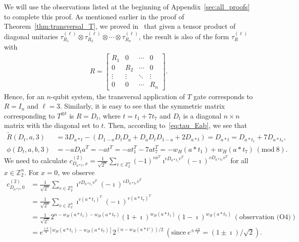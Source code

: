 \documentclass[twoside,romanappendices]{IEEEtran}
\begin{document}
We will use the observations listed at the beginning of Appendix~\ref{sec:all_proofs} to complete this proof.
As mentioned earlier in the proof of Theorem~\ref{thm:transversal_T}, we proved in~\cite{Rengaswamy-pra19} that given a tensor product of diagonal unitaries $\tau_{R_1}^{(\ell)} \otimes \tau_{R_2}^{(\ell)} \otimes \cdots \otimes \tau_{R_n}^{(\ell)}$, the result is also of the form $\tau_R^{(\ell)}$ with 
\begin{align}
R = 
\begin{bmatrix}
R_1 & 0 & \cdots & 0 \\
0 & R_2 & \cdots & 0 \\
\vdots & \vdots & \ddots & \vdots \\
0 & 0 & \cdots & R_n 
\end{bmatrix}.
\end{align}
Hence, for an $n$-qubit system, the transversal application of $T$ gate corresponds to $R = I_n$ and $\ell = 3$.
Similarly, it is easy to see that the symmetric matrix corresponding to $T^{\otimes t}$ is $R = D_t$, where $t = t_1 + 7 t_7$ and $D_t$ is a diagonal $n \times n$ matrix with the diagonal set to $t$.
Then, according to~\eqref{eq:tau_Eab}, we see that
\begin{align}
\tilde{R}(D_t,a,3) & = 3 D_{a \ast t} - (D_{1-a} D_t D_a + D_a D_t D_{1-a} + 2 D_{a \ast t}) = D_{a \ast t} = D_{a \ast t_1} + 7 D_{a \ast t_7}, \\
%
\phi(D_t,a,b,3) & = - a D_t a^T = - at^T = -at_1^T - 7 at_7^T = - w_H(a \ast t_1) + w_H(a \ast t_7)\ (\text{mod}\ 8).
\end{align}
We need to calculate $c_{D_{a \ast t},x}^{(2)} = \frac{1}{\sqrt{2^n}} \sum_{v \in \mathbb{Z}_2^n} (-1)^{vx^T} \imath^{v D_{a \ast t_1} v^T} (-\imath)^{v D_{a \ast t_7} v^T}$ for all $x \in \mathbb{Z}_2^n$.
For $x = 0$, we observe
\begin{align}
c_{D_{a \ast t},0}^{(2)} & = \frac{1}{\sqrt{2^n}} \sum_{v \in \mathbb{Z}_2^n} \imath^{v D_{a \ast t_1} v^T} (-\imath)^{v D_{a \ast t_7} v^T} \\
%
  & = \frac{1}{\sqrt{2^n}} \sum_{v \in \mathbb{Z}_2^n} \imath^{v (a \ast t_1)^T} (-\imath)^{v (a \ast t_7)^T} \\
%
  & = \frac{1}{\sqrt{2^n}} 2^{n - w_H(a \ast t_1) - w_H(a \ast t_7)} (1 + \imath)^{w_H(a \ast t_1)} (1 - \imath)^{w_H(a \ast t_7)} \ (\text{observation\ (O4)}) \\
% 
  & = e^{\frac{\imath \pi}{4} \left[ w_H(a \ast t_1) - w_H(a \ast t_7) \right]} 2^{\left( n - w_H(a \ast t') \right)/2} \ (\text{since}\ e^{\pm \frac{\imath \pi}{4}} = (1 \pm \imath)/\sqrt{2}).
\end{align}
\end{document}

